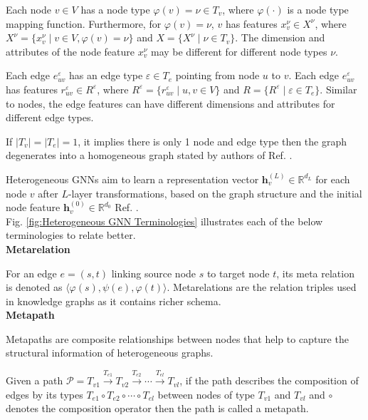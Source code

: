 \documentclass{report} %
\begin{document}
Each node \( v \in V \) has a node type \( \varphi(v) = \nu \in T_v \), where \( \varphi(\cdot) \) is a node type mapping function. 
Furthermore, for \( \varphi(v) = \nu \), \( v \) has features \( x_v^{\nu} \in X^{\nu} \), 
where \( X^{\nu} = \{ x_v^{\nu} \mid v \in V, \varphi(v) = \nu \} \) and \( X = \{ X^{\nu} \mid \nu \in T_v \} \). 
The dimension and attributes of the node feature \( x_v^{\nu} \) may be different for different node types \( \nu \). 

Each edge \( e_{uv}^{\varepsilon} \) has an edge type \( \varepsilon \in T_e \) pointing from node \( u \) to \( v \). 
Each edge \( e_{uv}^{\varepsilon} \) has features \( r_{uv}^{\varepsilon} \in R^{\varepsilon} \), 
where \( R^{\varepsilon} = \{ r_{uv}^{\varepsilon} \mid u, v \in V \} \) and \( R = \{ R^{\varepsilon} \mid \varepsilon \in T_e \} \). 
Similar to nodes, the edge features can have different dimensions and attributes for different edge types.

If \( |T_v| = |T_e| = 1 \), it implies there is only 1 node and edge type then the graph degenerates into a homogeneous graph stated by authors of Ref. \cite{SE HGNN-2023}.

Heterogeneous \ac{GNN}s aim to learn a representation vector \( \mathbf{h}^{(L)}_v \in \mathbb{R}^{d_L} \) for each node \( v \) after \( L \)-layer transformations, 
based on the graph structure and the initial node feature \( \mathbf{h}^{(0)}_v \in \mathbb{R}^{d_0} \) Ref. \cite{REF HGNN-2021}.\\

Fig. \ref{fig:Heterogeneous GNN Terminologies} illustrates each of the below terminologies to relate better.  \\

\textbf{Metarelation}

For an edge \( e = (s, t) \) linking source node \( s \) to target node \( t \), its meta relation is denoted as $\langle \varphi(s), \psi(e), \varphi(t) \rangle.$
Metarelations are the relation triples used in knowledge graphs as it contains richer schema. \\

\textbf{Metapath}

Metapaths are composite relationships between nodes that help to capture the structural information of heterogeneous graphs.

Given a path $\mathcal{P} = T_{v1} \xrightarrow{T_{e1}} T_{v2} \xrightarrow{T_{e2}} \cdots \xrightarrow{T_{el}} T_{vl}$, 
if the path describes the composition of edges by its types \( T_{e1} \circ T_{e2} \circ \cdots \circ T_{el} \) between nodes of type \( T_{v1} \) and \( T_{vl} \) and 
$\circ$ denotes the composition operator then the path is called a metapath. 
\end{document}

